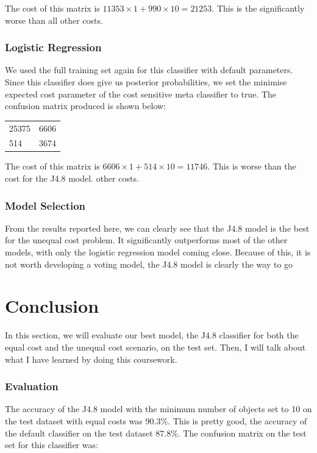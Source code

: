 \documentclass[a4paper,11pt]{article}
\begin{document}
The cost of this matrix is $ 11353 \times 1 + 990 \times 10 = 21253 $. This is the significantly worse than all
other costs.

\subsubsection{Logistic Regression}

We used the full training set again for this classifier with default parameters. Since this classifier does give
us posterior probabilities, we set the minimise expected cost parameter of the cost sensitive meta classifier
to true. The confusion matrix produced is shown below:

\begin{table}[H]
  \begin{center}
    \begin{tabular}{l l }
      25375 & 6606 \\
      514 & 3674 \\
    \end{tabular}
  \end{center}
  \label{tab:LogisticCost}
\end{table}

The cost of this matrix is $ 6606 \times 1 + 514 \times 10 = 11746 $. This is worse than the cost for the J4.8 model.
other costs.

\subsubsection{Model Selection}
From the results reported here, we can clearly see that the J4.8 model is the best for the unequal
cost problem. It significantly outperforms most of the other models, with only the logistic regression model
coming close. Because of this, it is not worth developing a voting model, the J4.8 model is clearly the way to go

\section{Conclusion}

In this section, we will evaluate our best model, the J4.8 classifier for both the equal cost and the unequal cost scenario,
on the test set. Then, I will talk about what I have learned by doing this coursework.

\subsubsection{Evaluation}
The accuracy of the J4.8 model with the minimum number of objects set to 10 on the test dataset with equal costs was 90.3\%.
This is pretty good, the accuracy of the default classifier on the test dataset 87.8\%. The confusion matrix on the test set
for this classifier was:
\end{document}
